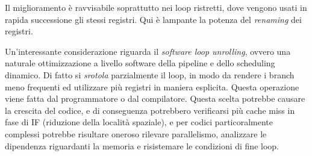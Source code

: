 \noindent Il miglioramento è ravvisabile soprattutto nei loop ristretti, dove vengono usati in rapida successione gli stessi registri. Qui è lampante la potenza del \textit{renaming} dei registri. 

\begin{info}
    Un'interessante considerazione riguarda il \textit{software loop unrolling}, ovvero una naturale ottimizzazione a livello software della pipeline e dello scheduling dinamico. Di fatto si \textit{srotola} parzialmente il loop, in modo da rendere i branch meno frequenti ed utilizzare più registri in maniera esplicita. Questa operazione viene fatta dal programmatore o dal compilatore. Questa scelta potrebbe causare la crescita del codice, e di conseguenza potrebbero verificarsi più cache miss in fase di IF (riduzione della località spaziale), e per codici particoralmente complessi potrebbe risultare oneroso rilevare parallelismo, analizzare le dipendenza riguardanti la memoria e risistemare le condizioni di fine loop.
\end{info}
